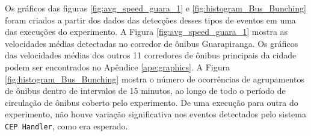 Os gráficos das figuras \ref{fig:avg_speed_guara_1} e \ref{fig:histogram_Bus_Bunching} foram criados a partir dos dados das detecções desses tipos de eventos em uma das execuções do experimento. A Figura  \ref{fig:avg_speed_guara_1} mostra as velocidades médias detectadas no corredor de ônibus Guarapiranga. Os gráficos das velocidades médias dos outros 11 corredores de ônibus principais da cidade podem ser encontrados no Apêndice \ref{ape:graphics}. A Figura \ref{fig:histogram_Bus_Bunching} mostra o número de ocorrências de agrupamentos de ônibus dentro de intervalos de 15 minutos, ao longo de todo o período de circulação de ônibus coberto pelo experimento. De uma execução para outra do experimento, não houve variação significativa nos eventos detectados pelo sistema \texttt{CEP Handler}, como era esperado. 





